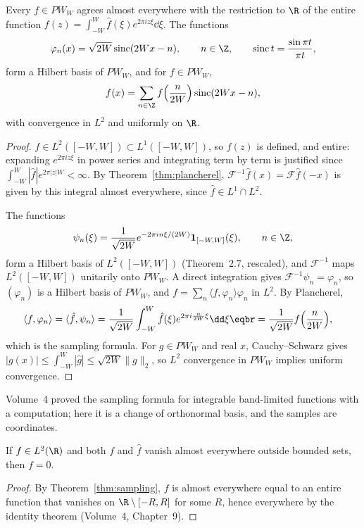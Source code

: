 \begin{theorem}\label{thm:sampling}
Every $f\in PW_W$ agrees almost everywhere with the restriction to $\R$ of the entire function $f(z)=\int_{-W}^W\hat f(\xi)e^{2\pi iz\xi}\dd\xi$. The functions
\[\varphi_n(x)=\sqrt{2W}\operatorname{sinc}(2Wx-n),\qquad n\in\Z,\qquad\operatorname{sinc}t=\frac{\sin\pi t}{\pi t},\]
form a Hilbert basis of $PW_W$, and for $f\in PW_W$,
\[f(x)=\sum_{n\in\Z}f\Bigl(\frac n{2W}\Bigr)\operatorname{sinc}(2Wx-n),\]
with convergence in $L^2$ and uniformly on $\R$.
\end{theorem}
\begin{proof}
$\hat f\in L^2([-W,W])\subset L^1([-W,W])$, so $f(z)$ is defined, and entire: expanding $e^{2\pi iz\xi}$ in power series and integrating term by term is justified since $\int_{-W}^W|\hat f|e^{2\pi|z|W}<\infty$. By
Theorem~\ref{thm:plancherel}, $\mathcal F^{-1}\hat f(x)=\mathcal F\hat f(-x)$ is given by this integral almost everywhere, since $\hat f\in L^1\cap L^2$.

The functions
\[\psi_n(\xi)=\frac1{\sqrt{2W}}e^{-2\pi in\xi/(2W)}\mathbf 1_{[-W,W]}(\xi),\qquad n\in\Z,\]
form a Hilbert basis of $L^2([-W,W])$ (Theorem~2.7, rescaled), and $\mathcal F^{-1}$ maps $L^2([-W,W])$ unitarily onto $PW_W$. A direct
integration gives $\mathcal F^{-1}\psi_n=\varphi_n$, so $(\varphi_n)$ is a Hilbert basis of $PW_W$, and $f=\sum_n\langle f,\varphi_n\rangle\varphi_n$ in $L^2$. By Plancherel,
\[\begin{aligned}\langle f,\varphi_n\rangle&=\langle\hat f,\psi_n\rangle=\frac1{\sqrt{2W}}\int_{-W}^W\hat f(\xi)e^{2\pi i\frac n{2W}\xi}\dd\xi\eqbr=\frac1{\sqrt{2W}}f\Bigl(\frac n{2W}\Bigr),\end{aligned}\]
which is the sampling formula. For $g\in PW_W$ and real $x$, Cauchy--Schwarz gives $|g(x)|\le\int_{-W}^W|\hat g|\le\sqrt{2W}\|g\|_2$, so $L^2$ convergence in $PW_W$ implies uniform convergence.
\end{proof}

Volume~4 proved the sampling formula for integrable band-limited functions with a computation; here it is a change of orthonormal basis, and the samples are coordinates.

\begin{corollary}\label{cor:nocompact}
If $f\in L^2(\R)$ and both $f$ and $\hat f$ vanish almost everywhere outside bounded sets, then $f=0$.
\end{corollary}
\begin{proof}
By Theorem~\ref{thm:sampling}, $f$ is almost everywhere equal to an entire function that vanishes on $\R\setminus[-R,R]$ for some $R$, hence everywhere by the identity theorem (Volume~4, Chapter~9).
\end{proof}

